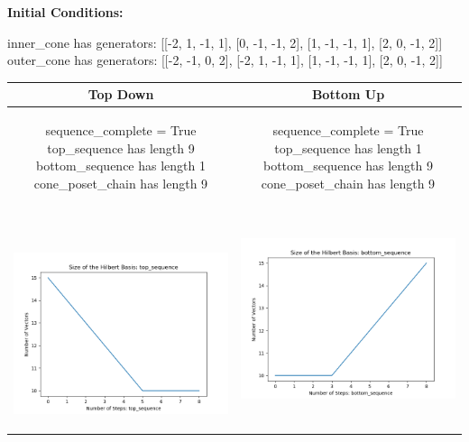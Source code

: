 \documentclass[10pt]{article}
\begin{document}
\textbf{Initial Conditions:}
\begin{SAGE}
inner_cone has generators: 
[[-2, 1, -1, 1], [0, -1, -1, 2], [1, -1, -1, 1], [2, 0, -1, 2]]
outer_cone has generators: 
[[-2, -1, 0, 2], [-2, 1, -1, 1], [1, -1, -1, 1], [2, 0, -1, 2]]

\end{SAGE}
\begin{tabular}{c|c}
\textbf{Top Down} & \textbf{Bottom Up} \\ \hline  
\begin{SAGE}
	sequence_complete = True
	top_sequence has length 9
	bottom_sequence has length 1
	cone_poset_chain has length 9
\end{SAGE} 
&
\begin{SAGE}
	sequence_complete = True
	top_sequence has length 1
	bottom_sequence has length 9
	cone_poset_chain has length 9
\end{SAGE} 
\\ \hline
\
\begin{minipage}{.45\textwidth}
\includegraphics[width=\textwidth]{"DATA/4d/4 generators 2 bound B/top_sequence SIZE"}
\end{minipage} &
\begin{minipage}{.45\textwidth}
\includegraphics[width=\textwidth]{"DATA/4d/4 generators 2 bound B bottomup/bottom_sequence SIZE"}

\end{minipage}
\end{tabular}
\end{document}
